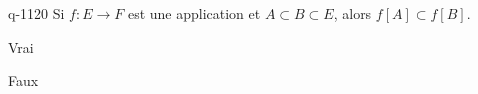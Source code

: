 \begin{truefalse}{q-1120}
Si $f : E \to F$ est une application et $A \subset B \subset E$, alors $f[A] \subset f[B]$.
\item* Vrai
\item Faux
\end{truefalse}

